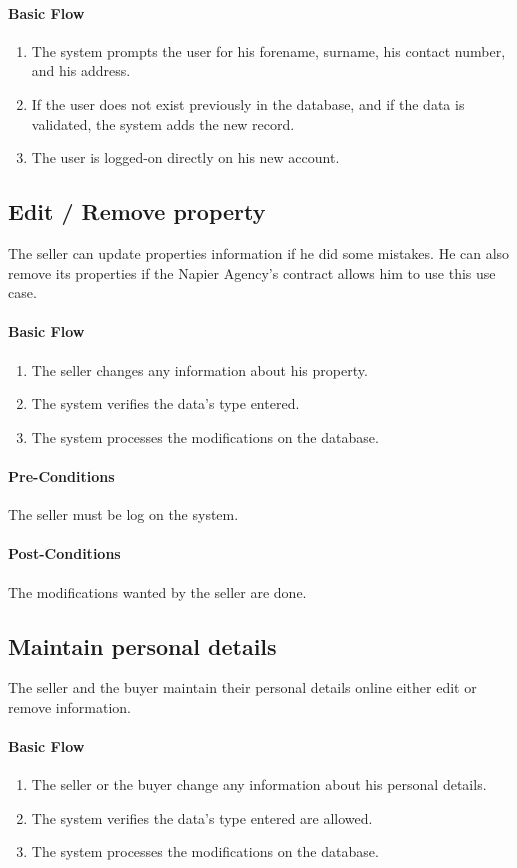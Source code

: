 \documentclass[a4paper,12pt]{article}
\begin{document}
\paragraph{Basic Flow}
\begin{enumerate}
\item The system prompts the user for his forename, surname, his contact number, and his address.
\item If the user does not exist previously in the database, and if the data is validated, the system adds the new record.
\item The user is logged-on directly on his new account.
\end{enumerate}

\subsection{Edit / Remove property}
The seller can update properties information if he did some mistakes. He can also remove its properties if the Napier Agency's contract allows him to use this use case.
\paragraph{Basic Flow}
\begin{enumerate}
\item The seller changes any information about his property.
\item The system verifies the data's type entered.
\item The system processes the modifications on the database.
\end{enumerate}
\paragraph{Pre-Conditions}
The seller must be log on the system.
\paragraph{Post-Conditions}
The modifications wanted by the seller are done.

\subsection{Maintain personal details}
The seller and the buyer maintain their personal details online either edit or remove information.
\paragraph{Basic Flow}
\begin{enumerate}
\item The seller or the buyer change any information about his personal details.
\item The system verifies the data's type entered are allowed.
\item The system processes the modifications on the database.
\end{enumerate}
\end{document}
